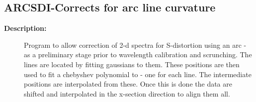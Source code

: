\subsection{ARCSDI-\label{ARCSDI}Corrects for arc line curvature}
\begin{description}

\item [\textbf{Description:}]
   Program to allow correction of 2-d spectra for S-distortion using
   an arc - as a preliminary stage prior to wavelength calibration
   and scrunching.
     The lines are located by fitting gaussians to them.
     These positions are then used to fit a chebyshev polynomial
   to - one for each line. The intermediate positions are interpolated
   from these.
   Once this is done the data are shifted and interpolated in the
   x-section direction to align them all.



\end{description}
